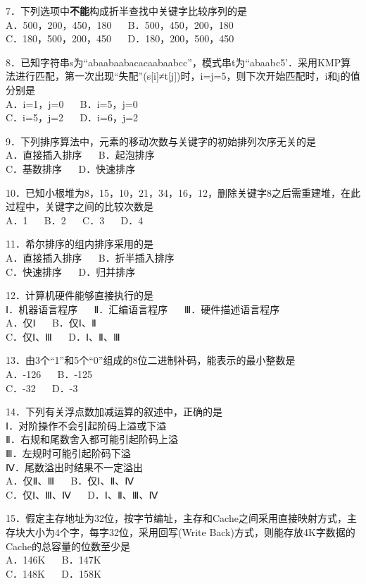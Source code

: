 7．下列选项中\textbf{不能}构成折半查找中关键字比较序列的是 \\
A．500，200，450，180 $\quad$ B．500，450，200，180 \\
C．180，500，200，450 $\quad$ D．180，200，500，450

8．已知字符串s为“abaabaabacacaabaabcc”，模式串t为“abaabc5’．采用KMP算法进行匹配，第一次出现“失配”(s[i]≠t[j])时，i=j=5，则下次开始匹配时，i和j的值分别是 \\
A．i=1，j=0 $\quad$ B．i=5，j=0 \\
C．i=5，j=2 $\quad$ D．i=6，j=2

9．下列排序算法中，元素的移动次数与关键字的初始排列次序无关的是 \\
A．直接插入排序 $\quad$ B．起泡排序 \\
C．基数排序 $\quad$ D．快速排序

10．已知小根堆为8，15，10，21，34，16，12，删除关键字8之后需重建堆，在此过程中，关键字之间的比较次数是 \\
A．1 $\quad$ B．2 $\quad$ C．3 $\quad$ D．4

11．希尔排序的组内排序采用的是 \\
A．直接插入排序 $\quad$ B．折半插入排序 \\
C．快速排序 $\quad$ D．归并排序

12．计算机硬件能够直接执行的是 \\
Ⅰ．机器语言程序 $\quad$ Ⅱ．汇编语言程序 $\quad$ Ⅲ．硬件描述语言程序 \\
A．仅Ⅰ $\quad$ B．仅Ⅰ、Ⅱ \\
C．仅Ⅰ、Ⅲ $\quad$ D．Ⅰ、Ⅱ、Ⅲ

13．由3个“1”和5个“0”组成的8位二进制补码，能表示的最小整数是 \\
A．-126 $\quad$ B．-125 \\
C．-32 $\quad$ D．-3

14．下列有关浮点数加减运算的叙述中，正确的是 \\
Ⅰ．对阶操作不会引起阶码上溢或下溢 \\
Ⅱ．右规和尾数舍入都可能引起阶码上溢 \\
Ⅲ．左规时可能引起阶码下溢 \\
Ⅳ．尾数溢出时结果不一定溢出 \\
A．仅Ⅱ、Ⅲ $\quad$ B．仅Ⅰ、Ⅱ、Ⅳ \\
C．仅Ⅰ、Ⅲ、Ⅳ $\quad$ D．Ⅰ、Ⅱ、Ⅲ、Ⅳ

15．假定主存地址为32位，按字节编址，主存和Cache之间采用直接映射方式，主存块大小为4个字，每字32位，采用回写(Write Back)方式，则能存放4K字数据的Cache的总容量的位数至少是 \\
A．146K $\quad$ B．147K \\
C．148K $\quad$ D．158K

